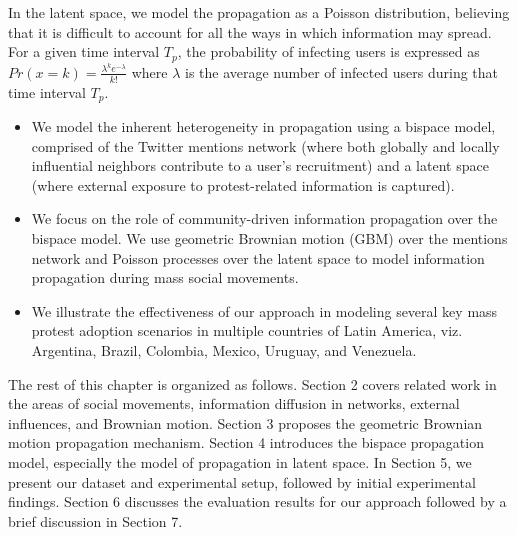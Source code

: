 In the latent space, we model the propagation as a Poisson distribution, believing that it is difficult to account for all the ways in which information may spread. For a given time interval $T_p$, the probability of infecting users is expressed as $Pr(x=k)=\frac{\lambda^k e^{-\lambda}}{k!}$ where $\lambda$ is the average number of infected users during that time interval $T_p$.
\vspace{2 mm}
\fi

\begin{itemize}
\item
We model the inherent heterogeneity in propagation using a
bispace model, comprised of the Twitter mentions network (where
both globally and locally influential neighbors contribute to a user's
recruitment) and a
latent space (where external exposure to protest-related information is
captured).
\item We focus on the role of community-driven information propagation
over the bispace model. We use geometric Brownian motion (GBM)
over the mentions network and Poisson processes over the latent space to model information propagation during mass social movements.
\item We illustrate the effectiveness of our approach in modeling several key mass protest adoption scenarios in multiple countries of Latin America, viz.
Argentina, Brazil,
Colombia,
Mexico,
Uruguay, and
Venezuela.

\end{itemize}

The rest of this chapter is organized as follows. Section 2 covers related work in the areas of social movements, information diffusion in networks, external influences, and Brownian motion. Section 3 proposes the geometric Brownian motion propagation mechanism. Section 4 introduces the bispace propagation model, especially the model of propagation in latent space. In Section 5, we
present our dataset and experimental setup,
followed by initial experimental findings. Section 6 discusses the
evaluation results for our approach followed by a brief discussion in
Section 7.
